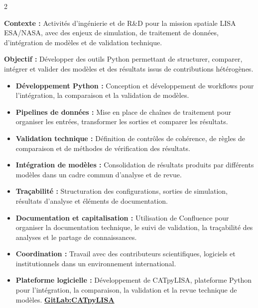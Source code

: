 \documentclass[8pt,a4paper,ragged2e,withhyper]{../_shared/altacv}
\begin{document}
\begin{paracol}{2}
\divider


\textbf{Contexte :} Activités d'ingénierie et de R\&D pour la mission spatiale LISA ESA/NASA, avec des enjeux de simulation, de traitement de données, d'intégration de modèles et de validation technique.

\textbf{Objectif :} Développer des outils Python permettant de structurer, comparer, intégrer et valider des modèles et des résultats issus de contributions hétérogènes.

\begin{itemize}
  \item \textbf{Développement Python :} Conception et développement de workflows pour l'intégration, la comparaison et la validation de modèles.
  \item \textbf{Pipelines de données :} Mise en place de chaînes de traitement pour organiser les entrées, transformer les sorties et comparer les résultats.
  \item \textbf{Validation technique :} Définition de contrôles de cohérence, de règles de comparaison et de méthodes de vérification des résultats.
  \item \textbf{Intégration de modèles :} Consolidation de résultats produits par différents modèles dans un cadre commun d'analyse et de revue.
  \item \textbf{Traçabilité :} Structuration des configurations, sorties de simulation, résultats d'analyse et éléments de documentation.
  \item \textbf{Documentation et capitalisation :} Utilisation de Confluence pour organiser la documentation technique, le suivi de validation, la traçabilité des analyses et le partage de connaissances.
  \item \textbf{Coordination :} Travail avec des contributeurs scientifiques, logiciels et institutionnels dans un environnement international.
  \item \textbf{Plateforme logicielle :} Développement de CATpyLISA, plateforme Python pour l'intégration, la comparaison, la validation et la revue technique de modèles.
  \textcolor{DarkPastelRed}{\href{https://gitlab.oca.eu/gboileau/lisa_l3_tools}{\bf GitLab:CATpyLISA}}
\end{itemize}

\divider



\end{paracol}
\end{document}

